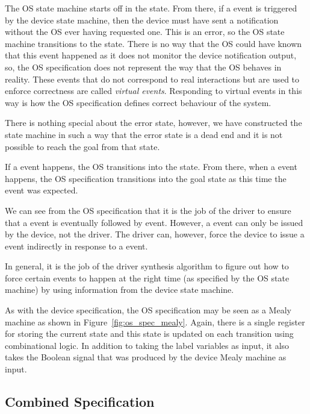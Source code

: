 The OS state machine starts off in the  state. From there, if a  event is triggered by the device state machine, then the device must have sent a notification without the OS ever having requested one. This is an error, so the OS state machine transitions to the  state. There is no way that the OS could have known that this event happened as it does not monitor the device notification output, so, the OS specification does not represent the way that the OS behaves in reality. These events that do not correspond to real interactions but are used to enforce correctness are called \emph{virtual events}. Responding to virtual events in this way is how the OS specification defines correct behaviour of the system.

There is nothing special about the error state, however, we have constructed the state machine in such a way that the error state is a dead end and it is not possible to reach the goal from that state.

If a  event happens, the OS transitions into the  state. From there, when a  event happens, the OS specification transitions into the goal state as this time the  event was expected. 

We can see from the OS specification that it is the job of the driver to ensure that a  event is eventually followed by  event. However, a  event can only be issued by the device, not the driver. The driver can, however, force the device to issue a  event indirectly in response to a  event. 

In general, it is the job of the driver synthesis algorithm to figure out how to force certain events to happen at the right time (as specified by the OS state machine) by using information from the device state machine. 

As with the device specification, the OS specification may be seen as a Mealy machine as shown in Figure~\ref{fig:os_spec_mealy}. Again, there is a single register for storing the current state and this state is updated on each transition using combinational logic. In addition to taking the label variables as input, it also takes the  Boolean signal that was produced by the device Mealy machine as input. 

\subsection{Combined Specification}


